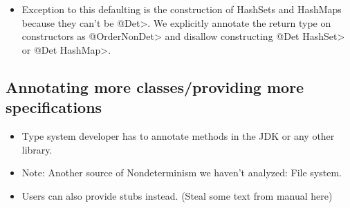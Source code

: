 \begin{itemize}
    \item Exception to this defaulting is the construction of HashSets and HashMaps because they can't be \<@Det>.
    We explicitly annotate the return type on constructors as
    \<@OrderNonDet> and disallow constructing \<@Det HashSet> or \<@Det
    HashMap>.
\end{itemize}

\subsection{Annotating more classes/providing more specifications}\label{annotating-jdk}
\begin{itemize}
    \item Type system developer has to annotate methods in the JDK or any other library.
    \item Note: Another source of Nondeterminism we haven't analyzed: File system.
    \item Users can also provide stubs instead. (Steal some text from manual here)
\end{itemize}
